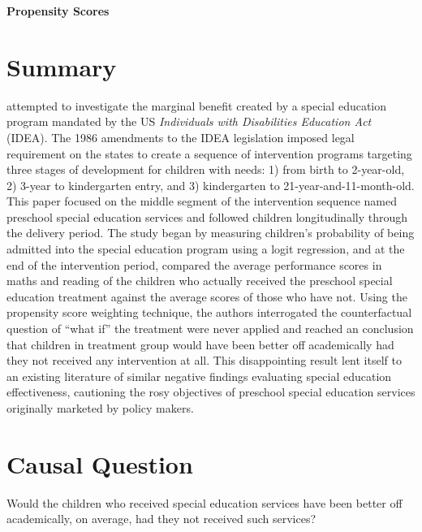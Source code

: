 \begin{center}
    \textbf{Propensity Scores}
\end{center}

\begin{hangparas}{0.5in}{1}
\end{hangparas}

\section{Summary}

\textcite{sullivan:2013} attempted to investigate the marginal benefit created by a special education program mandated by the US \textit{Individuals with Disabilities Education Act} (IDEA). The 1986 amendments to the IDEA legislation imposed legal requirement on the states to create a sequence of intervention programs targeting three stages of development for children with needs: 1) from birth to 2-year-old, 2) 3-year to kindergarten entry, and 3) kindergarten to 21-year-and-11-month-old. This paper focused on the middle segment of the intervention sequence named preschool special education services and followed children longitudinally through the delivery period. The study began by measuring children's probability of being admitted into the special education program using a logit regression, and at the end of the intervention period, compared the average performance scores in maths and reading of the children who actually received the preschool special education treatment against the average scores of those who have not. Using the propensity score weighting technique, the authors interrogated the counterfactual question of ``what if'' the treatment were never applied and reached an conclusion that children in treatment group would have been better off academically had they not received any intervention at all. This disappointing result lent itself to an existing literature of similar negative findings evaluating special education effectiveness, cautioning the rosy objectives of preschool special education services originally marketed by policy makers.

\section{Causal Question}

Would the children who received special education services have been better off academically, on average, had they not received such services?

